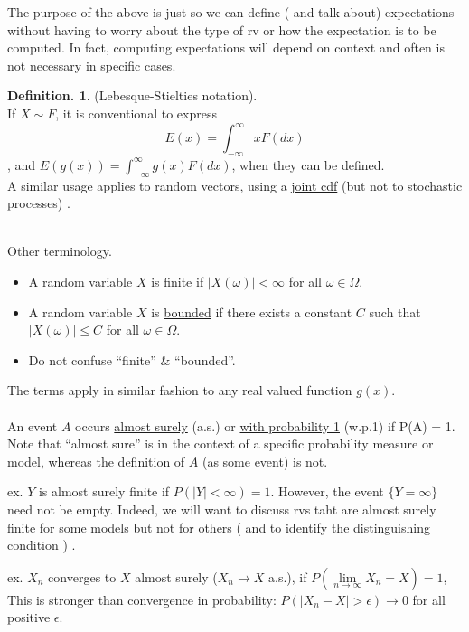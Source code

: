\documentclass[12pt]{article}
\theoremstyle{definition}
\newtheorem{mydef}{Definition.}[section]
\theoremstyle{plain}
\begin{document}
The purpose of the above is just so we can define ( and talk about) expectations without having to worry about the type of rv or how the expectation is to be computed. In fact, computing expectations will depend on context and often is not necessary in specific cases.

\begin{mydef}
(Lebesque-Stielties notation). \\
If $X \sim F$, it is conventional to express \[E(x) = \int_{-\infty}^{\infty} x F(dx)\], and $E(g(x)) = \int_{-\infty}^{\infty}g(x)F(dx)$, when they can be defined. \\
A similar usage applies to random vectors, using a \underline{joint cdf} (but not to stochastic processes) .
\end{mydef}
$\mbox{}$\\
Other terminology. 
\begin{itemize}
\item A random variable $X$ is \underline{finite} if $|X(\omega)| < \infty$ for \underline{all} $\omega \in \Omega$. 
\item A random variable $X$ is \underline{bounded} if there exists a constant $C$ such that $|X(\omega)| \leq C$ for all $\omega \in \Omega$. 
\item Do not confuse ``finite'' \& ``bounded''. 
\end{itemize}

The terms apply in similar fashion to any real valued function $g(x)$.  \\ \\
An event $A$ occurs \underline{almost surely} (a.s.) or \underline{with probability 1} (w.p.1) if P(A) = 1. \\ 
Note that ``almost sure'' is in the context of a specific probability measure or model, whereas the definition of $A$ (as some event) is not. 

ex. $Y$ is almost surely finite if $P(|Y| < \infty) = 1$. However, the event $\{Y = \infty\}$ need not be empty. Indeed, we will want to discuss rvs taht are almost surely finite for some models but not for others ( and to identify the distinguishing condition ) . 

ex. $X_n$ converges to $X$ almost surely ($X_n \rightarrow X$ a.s.), if $P(\lim \limits_{n \rightarrow \infty}X_n = X) = 1$, \\
This is stronger than convergence in probability:  $P(|X_n - X| > \epsilon) \rightarrow 0$ for all positive $\epsilon$.
\end{document}
